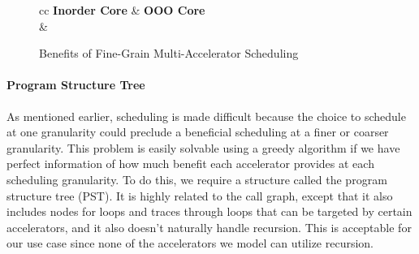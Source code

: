 \begin{figure}
\begin{adjustwidth}{-0.75in}{-0.75in}
\begin{center}
\footnotesize
\def\arraystretch{0.25}
\begin{tabular}{cc}
\textbf{Inorder Core} &
\textbf{OOO Core} \\ 
     &
     \\
\end{tabular}
\end{center}
\vspace{-0.1in}
\caption{Benefits of Fine-Grain Multi-Accelerator Scheduling}

\label{fig:benefit-multiacc}
\end{adjustwidth}
\end{figure}

\paragraph{Program Structure Tree}  As mentioned earlier, scheduling is made
difficult because the choice to schedule at one granularity could preclude a
beneficial scheduling at a finer or coarser granularity.  This problem is
easily solvable using a greedy algorithm if we have perfect information of how
much benefit each accelerator provides at each scheduling granularity.  To do
this, we require a structure called the program structure tree (PST).  It is
highly related to the call graph, except that it also includes nodes for loops
and traces through loops that can be targeted by certain accelerators, and it
also doesn't naturally handle recursion.  This is acceptable for our use case
since none of the accelerators we model can utilize recursion.   

